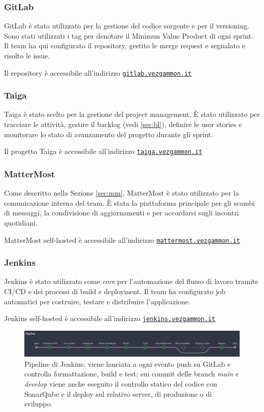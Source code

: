 \documentclass{article}
\begin{document}
\subsubsection{GitLab}
GitLab è stato utilizzato per la gestione del codice sorgente e per il versioning. Sono stati utilizzati i tag per denotare 
il Minimun Value Product di ogni sprint. 
Il team ha qui configurato il repository, gestito le merge request e segnalato e risolto le issue.

Il repository è accessibile all'indirizzo \href{https://gitlab.vezgammon.it}{\texttt{gitlab.vezgammon.it}}  

\subsubsection{Taiga}
Taiga è stato scelto per la gestione del project management. È stato utilizzato per tracciare le attività, gestire il 
backlog (vedi \ref{sec:bl}), definire le user stories e monitorare lo stato di avanzamento del progetto durante gli sprint.

Il progetto Taiga è accessibile all'indirizzo \href{https://taiga.vezgammon.it}{\texttt{taiga.vezgammon.it}}

\subsubsection{MatterMost}
Come descritto nella Sezione \ref{sec:mm}, MatterMost è stato utilizzato per la comunicazione interna del team. È stata 
la piattaforma principale per gli scambi di messaggi, la condivisione di aggiornamenti e per accordarsi sugli incontri quotidiani.

MatterMost self-hosted è accessibile all'indirizzo \href{https://mattermost.vezgammon.it}{\texttt{mattermost.vezgammon.it}}

\newpage

\subsubsection{Jenkins}
Jenkins è stato utilizzato come \textit{core} per l'automazione del flusso di lavoro tramite CI/CD e dei processi di build 
e deployment. Il team ha configurato job automatici per costruire, testare e distribuire l'applicazione.

Jenkins self-hosted è accessibile all'indirizzo \href{https://jenkins.vezgammon.it}{\texttt{jenkins.vezgammon.it}}

\begin{figure}[H]
    \centering
    \includegraphics[width=1\textwidth]{report-jk_pipeline}
    \caption{Pipeline di Jenkins: viene lanciata a ogni evento push su GitLab e controlla formattazione, build e test; sui 
    commit delle branch \textit{main} e \textit{develop} viene anche eseguito il controllo statico del codice con SonarQube 
    e il deploy sul relativo server, di produzione o di sviluppo.}
    \label{fig:jk_pipeline}
\end{figure}
\end{document}
